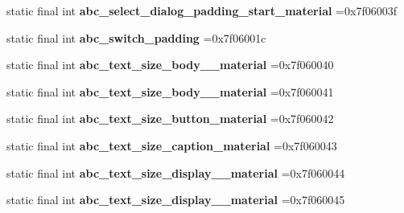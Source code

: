 \begin{DoxyCompactItemize}
\item 
\mbox{\label{classproject4_1_1xaria_1_1R_1_1dimen_ade98460f766e076ded006ad2fb8f4a5b}} 
static final int {\bfseries abc\+\_\+select\+\_\+dialog\+\_\+padding\+\_\+start\+\_\+material} =0x7f06003f
\item 
\mbox{\label{classproject4_1_1xaria_1_1R_1_1dimen_a34ec5ddd5edeff5bf2f37ddc99f1cd4e}} 
static final int {\bfseries abc\+\_\+switch\+\_\+padding} =0x7f06001c
\item 
\mbox{\label{classproject4_1_1xaria_1_1R_1_1dimen_afc855c6a5b6b2578161fc5d3dd5a0d24}} 
static final int {\bfseries abc\+\_\+text\+\_\+size\+\_\+body\+\_\+\_\+material} =0x7f060040
\item 
\mbox{\label{classproject4_1_1xaria_1_1R_1_1dimen_a8ca265d28cad2d3787fbd9a7aa830e97}} 
static final int {\bfseries abc\+\_\+text\+\_\+size\+\_\+body\+\_\+\_\+material} =0x7f060041
\item 
\mbox{\label{classproject4_1_1xaria_1_1R_1_1dimen_ae61d027074ce68b20c72221717a54f94}} 
static final int {\bfseries abc\+\_\+text\+\_\+size\+\_\+button\+\_\+material} =0x7f060042
\item 
\mbox{\label{classproject4_1_1xaria_1_1R_1_1dimen_ab6345c66ec97a5a9825f3a4a0ff9ec9a}} 
static final int {\bfseries abc\+\_\+text\+\_\+size\+\_\+caption\+\_\+material} =0x7f060043
\item 
\mbox{\label{classproject4_1_1xaria_1_1R_1_1dimen_a7a171308721671dc57b39ffd2913278f}} 
static final int {\bfseries abc\+\_\+text\+\_\+size\+\_\+display\+\_\+\_\+material} =0x7f060044
\item 
\mbox{\label{classproject4_1_1xaria_1_1R_1_1dimen_ac49e78ff392295459fea19e1fd3b2979}} 
static final int {\bfseries abc\+\_\+text\+\_\+size\+\_\+display\+\_\+\_\+material} =0x7f060045
\item 
\mbox{\label{classproject4_1_1xaria_1_1R_1_1dimen_a80fe4d9a50ad884f06d86c0b40e9e6d8}} 

\end{DoxyCompactItemize}
